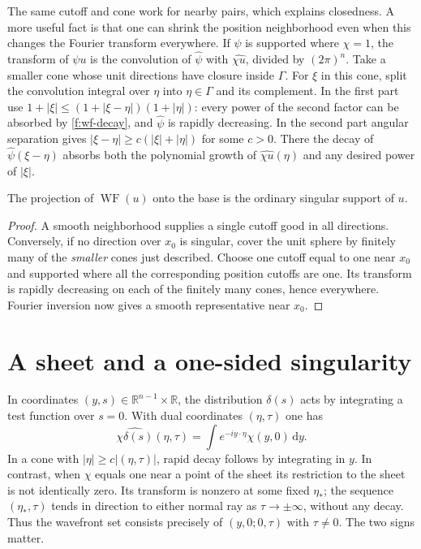 The same cutoff and cone work for nearby pairs, which explains closedness.
A more useful fact is that one can shrink the position neighborhood even
when this changes the Fourier transform everywhere. If $\psi$ is supported
where $\chi=1$, the transform of $\psi u$ is the convolution of
$\widehat\psi$ with $\widehat{\chi u}$, divided by $(2\pi)^n$.
Take a smaller cone whose unit directions have closure inside $\Gamma$.
For $\xi$ in this cone, split the convolution integral over $\eta$ into
$\eta\in\Gamma$ and its complement. In the first part use
$1+|\xi|\le(1+|\xi-\eta|)(1+|\eta|)$: every power of the second factor
can be absorbed by \eqref{f:wf-decay}, and $\widehat\psi$ is rapidly
decreasing. In the second part angular separation gives
$|\xi-\eta|\ge c(|\xi|+|\eta|)$ for some $c>0$. There the decay of
$\widehat\psi(\xi-\eta)$ absorbs both the polynomial growth of
$\widehat{\chi u}(\eta)$ and any desired power of $|\xi|$.

\begin{proposition}
The projection of $\operatorname{WF}(u)$ onto the base is the ordinary
singular support of $u$.
\end{proposition}
\begin{proof}
A smooth neighborhood supplies a single cutoff good in all directions.
Conversely, if no direction over $x_0$ is singular, cover the unit sphere
by finitely many of the \emph{smaller} cones just described. Choose one
cutoff equal to one near $x_0$ and supported where all the corresponding
position cutoffs are one. Its transform is rapidly decreasing on each of
the finitely many cones, hence everywhere. Fourier inversion now gives a
smooth representative near $x_0$.
\end{proof}

\section{A sheet and a one-sided singularity}
In coordinates $(y,s)\in\mathbb R^{n-1}\times\mathbb R$, the distribution
$\delta(s)$ acts by integrating a test function over $s=0$. With dual
coordinates $(\eta,\tau)$ one has
\[
 \widehat{\chi\delta(s)}(\eta,\tau)
    =\int e^{-iy\cdot\eta}\chi(y,0)\,\mathrm{d}y .
\]
In a cone with $|\eta|\ge c|(\eta,\tau)|$, rapid decay follows by
integrating in $y$. In contrast, when $\chi$ equals one near a point of
the sheet its restriction to the sheet is not identically zero. Its
transform is nonzero at some fixed $\eta_*$; the sequence
$(\eta_*,\tau)$ tends in direction to either normal ray as
$\tau\to\pm\infty$, without any decay. Thus the wavefront set consists
precisely of $(y,0;0,\tau)$ with $\tau\ne0$. The two signs matter.

